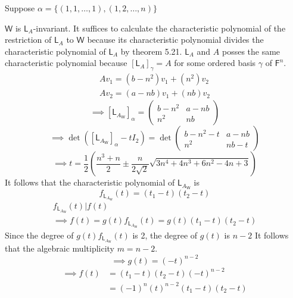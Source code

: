 Suppose $\alpha = \{(1,1,\dotsc,1),(1,2,\dotsc,n)\}$ 

$\mathsf{W}$ is $\mathsf{L}_A$-invariant. It suffices to calculate the
characteristic polynomial of the restriction of $\mathsf{L}_A$ to
$\mathsf{W}$ because its characteristic polynomial divides the
characteristic polynomial of $\mathsf{L}_A$ by theorem
5.21. $\mathsf{L}_A$ and $A$ posses the same characteristic polynomial
because $\left[\mathsf{L}_A\right]_\gamma = A$ for some ordered basis
$\gamma$ of $\mathsf{F}^n$.
\begin{gather}
Av_1 = (b-n^2)v_1 + (n^2)v_2\\
Av_2 = (a-nb)v_1 + (nb)v_2
\end{gather}
\begin{equation}
\implies \left[\mathsf{L}_{A_\mathsf{W}}\right]_\alpha =
\begin{pmatrix}
b-n^2 & a-nb\\
n^2 & nb
\end{pmatrix}
\end{equation}
\begin{equation}
\implies
\det{\left(\left[\mathsf{L}_{A_\mathsf{W}}\right]_\alpha-tI_2\right)}
= \det{\begin{pmatrix}
b-n^2 -t & a-nb\\
n^2 & nb -t
  \end{pmatrix}
}
\end{equation}
\begin{equation}
\implies t = \frac{1}{2}\left(\frac{n^3+n}{2} \pm
  \frac{n}{2\sqrt{2}}\sqrt{3n^4 +4n^3+6n^2-4n+3}\right)
\end{equation}
It follows that the characteristic polynomial of
$\mathsf{L}_{A_\mathsf{W}}$ is 
\begin{equation}
f_{\mathsf{L}_{A_\mathsf{W}}}(t) = (t_1-t)(t_2-t)
\end{equation}
\begin{gather}
f_{\mathsf{L}_{A_\mathsf{W}}}(t) | f(t) \\
\implies f(t) = g(t)f_{\mathsf{L}_{A_\mathsf{W}}}(t) = g(t)(t_1-t)(t_2-t)
\end{gather}
Since the degree of $g(t)f_{\mathsf{L}_{A_\mathsf{W}}}(t)$ is 2, the
degree of $g(t)$ is $n-2$ It follows that the algebraic multiplicity
$m= n-2.$
\begin{equation}
\implies g(t) = (-t)^{n-2}
\end{equation}
\begin{align}
\implies f(t) &= (t_1-t)(t_2-t)(-t)^{n-2} \\
&= (-1)^n(t)^{n-2}(t_1-t)(t_2-t)
\end{align}
